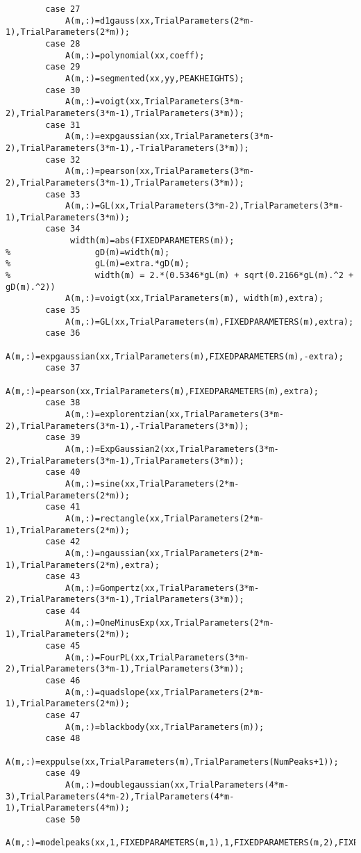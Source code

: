\begin{lstlisting}
        case 27
            A(m,:)=d1gauss(xx,TrialParameters(2*m-1),TrialParameters(2*m));
        case 28
            A(m,:)=polynomial(xx,coeff);
        case 29
            A(m,:)=segmented(xx,yy,PEAKHEIGHTS);
        case 30
            A(m,:)=voigt(xx,TrialParameters(3*m-2),TrialParameters(3*m-1),TrialParameters(3*m));        
        case 31
            A(m,:)=expgaussian(xx,TrialParameters(3*m-2),TrialParameters(3*m-1),-TrialParameters(3*m));        
        case 32
            A(m,:)=pearson(xx,TrialParameters(3*m-2),TrialParameters(3*m-1),TrialParameters(3*m));        
        case 33
            A(m,:)=GL(xx,TrialParameters(3*m-2),TrialParameters(3*m-1),TrialParameters(3*m));
        case 34
             width(m)=abs(FIXEDPARAMETERS(m));
%                 gD(m)=width(m);
%                 gL(m)=extra.*gD(m);
%                 width(m) = 2.*(0.5346*gL(m) + sqrt(0.2166*gL(m).^2 + gD(m).^2))
            A(m,:)=voigt(xx,TrialParameters(m), width(m),extra);
        case 35
            A(m,:)=GL(xx,TrialParameters(m),FIXEDPARAMETERS(m),extra);    
        case 36
            A(m,:)=expgaussian(xx,TrialParameters(m),FIXEDPARAMETERS(m),-extra);    
        case 37
            A(m,:)=pearson(xx,TrialParameters(m),FIXEDPARAMETERS(m),extra);    
        case 38
            A(m,:)=explorentzian(xx,TrialParameters(3*m-2),TrialParameters(3*m-1),-TrialParameters(3*m));        
        case 39
            A(m,:)=ExpGaussian2(xx,TrialParameters(3*m-2),TrialParameters(3*m-1),TrialParameters(3*m));        
        case 40
            A(m,:)=sine(xx,TrialParameters(2*m-1),TrialParameters(2*m));
        case 41
            A(m,:)=rectangle(xx,TrialParameters(2*m-1),TrialParameters(2*m));
        case 42
            A(m,:)=ngaussian(xx,TrialParameters(2*m-1),TrialParameters(2*m),extra);
        case 43
            A(m,:)=Gompertz(xx,TrialParameters(3*m-2),TrialParameters(3*m-1),TrialParameters(3*m));        
        case 44
            A(m,:)=OneMinusExp(xx,TrialParameters(2*m-1),TrialParameters(2*m));
        case 45
            A(m,:)=FourPL(xx,TrialParameters(3*m-2),TrialParameters(3*m-1),TrialParameters(3*m));        
        case 46
            A(m,:)=quadslope(xx,TrialParameters(2*m-1),TrialParameters(2*m));
        case 47
            A(m,:)=blackbody(xx,TrialParameters(m));
        case 48
            A(m,:)=exppulse(xx,TrialParameters(m),TrialParameters(NumPeaks+1));
        case 49
            A(m,:)=doublegaussian(xx,TrialParameters(4*m-3),TrialParameters(4*m-2),TrialParameters(4*m-1),TrialParameters(4*m));
        case 50
            A(m,:)=modelpeaks(xx,1,FIXEDPARAMETERS(m,1),1,FIXEDPARAMETERS(m,2),FIXEDPARAMETERS(m,3));

\end{lstlisting}
